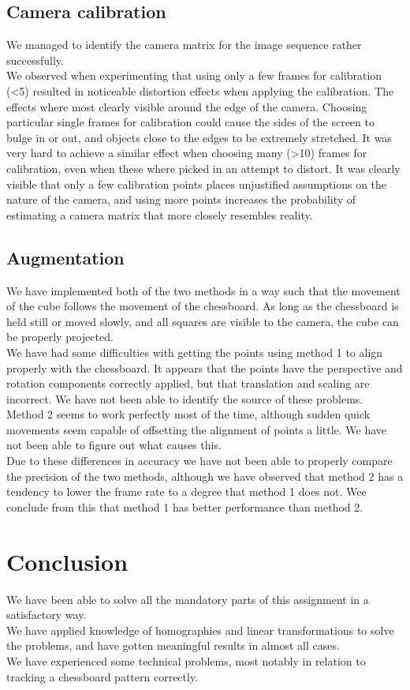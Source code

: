 	\subsection{Camera calibration}
	We managed to identify the camera matrix for the image sequence rather successfully. \\
	We observed when experimenting that using only a few frames for calibration (<5) resulted in noticeable distortion effects when applying the calibration. The effects where most clearly visible around the edge of the camera. Choosing particular single frames for calibration could cause the sides of the screen to bulge in or out, and objects close to the edges to be extremely stretched. It was very hard to achieve a similar effect when choosing many (>10) frames for calibration, even when these where picked in an attempt to distort. It was clearly visible that only a few calibration points places unjustified assumptions on the nature of the camera, and using more points increases the probability of estimating a camera matrix that more closely resembles reality. 
	\subsection{Augmentation}
	We have implemented both of the two methods in a way such that the movement of the cube follows the movement of the chessboard. As long as the chessboard is held still or moved slowly, and all squares are visible to the camera, the cube can be properly projected.\\
	We have had some difficulties with getting the points using method 1 to align properly with the chessboard. It appears that the points have the perspective and rotation components correctly applied, but that translation and scaling are incorrect. We have not been able to identify the source of these problems.\\
	Method 2 seems to work perfectly most of the time, although sudden quick movements seem capable of offsetting the alignment of points a little. We have not been able to figure out what causes this.\\
	Due to these differences in accuracy we have not been able to properly compare the precision of the two methods, although we have observed that method 2 has a tendency to lower the frame rate to a degree that method 1 does not. Wee conclude from this that method 1 has better performance than method 2. 
\section{Conclusion}
	We have been able to solve all the mandatory parts of this assignment in a satisfactory way.\\
	We have applied knowledge of homographies and linear transformations to solve the problems, and have gotten meaningful results in almost all cases.\\
	We have experienced some technical problems, most notably in relation to tracking a chessboard pattern correctly. 